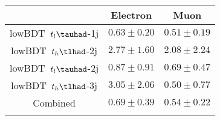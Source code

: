 \centering
\begin{tabular}{ccc} \toprule\toprule
 & Electron & Muon\\\midrule
lowBDT~$t_{l}\tauhad$-1j & $0.63\pm0.20$ & $0.51\pm0.19$\\
lowBDT~$t_{h}\tlhad$-2j & $2.77\pm1.60$ & $2.08\pm2.24$\\
lowBDT~$t_{l}\tauhad$-2j & $0.87\pm0.91$ & $0.69\pm0.47$\\
lowBDT~$t_{h}\tlhad$-3j & $3.05\pm2.06$ & $0.50\pm0.77$\\
Combined & $0.69\pm0.39$ & $0.54\pm0.22$\\
\bottomrule\bottomrule\\
\end{tabular}
